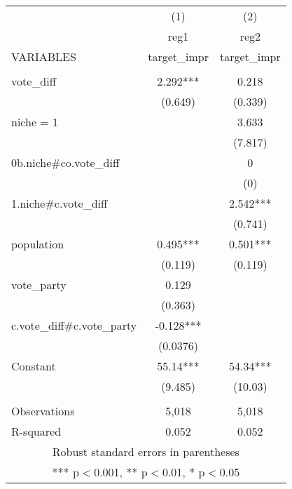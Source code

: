 \documentclass[]{article}
\begin{document}
\begin{tabular}{lcc} \hline
 & (1) & (2) \\
 & reg1 & reg2 \\
VARIABLES & target\_impr & target\_impr \\ \hline
 &  &  \\
vote\_diff & 2.292*** & 0.218 \\
 & (0.649) & (0.339) \\
niche = 1 &  & 3.633 \\
 &  & (7.817) \\
0b.niche\#co.vote\_diff &  & 0 \\
 &  & (0) \\
1.niche\#c.vote\_diff &  & 2.542*** \\
 &  & (0.741) \\
population & 0.495*** & 0.501*** \\
 & (0.119) & (0.119) \\
vote\_party & 0.129 &  \\
 & (0.363) &  \\
c.vote\_diff\#c.vote\_party & -0.128*** &  \\
 & (0.0376) &  \\
Constant & 55.14*** & 54.34*** \\
 & (9.485) & (10.03) \\
 &  &  \\
Observations & 5,018 & 5,018 \\
 R-squared & 0.052 & 0.052 \\ \hline
\multicolumn{3}{c}{ Robust standard errors in parentheses} \\
\multicolumn{3}{c}{ *** p$<$0.001, ** p$<$0.01, * p$<$0.05} \\
\end{tabular}
\end{document}
